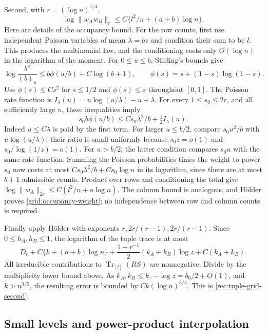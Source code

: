 Second, with $r=(\log n)^{1/4}$,
\begin{equation}\label{grid:occupancy-weight}
 \log\|w_Aw_B\|_r\le C\{l^2/n+(a+b)\log n\}.
\end{equation}
Here are details of the occupancy bound. For the row counts, first
use independent Poisson variables of mean $\lambda=bz$ and
condition their sum to be $l$. This produces the multinomial law,
and the conditioning costs only $O(\log n)$ in the logarithm of
the moment. For $0\le u\le b$, Stirling's bounds give
\[
 \log\frac{b^u}{(b)_u}
 \le b\phi(u/b)+C\log(b+1),\qquad
 \phi(s)=s+(1-s)\log(1-s).
\]
Use $\phi(s)\le Cs^2$ for $s\le1/2$ and $\phi(s)\le s$
throughout $[0,1]$. The Poisson rate function is
$I_\lambda(u)=u\log(u/\lambda)-u+\lambda$. For every
$1\le s_0\le2r$, and all sufficiently large $n$, these inequalities
imply
\[
 s_0b\phi(u/b)
 \le C s_0\lambda^2/b+\tfrac12I_\lambda(u).
\]
Indeed $u\le C\lambda$ is paid by the first term. For larger
$u\le b/2$, compare $s_0u^2/b$ with
$u\log(u/\lambda)$; their ratio is small uniformly because
$s_0z=o(1)$ and $s_0/\log(1/z)=o(1)$. For $u>b/2$, the latter
condition compares $s_0u$ with the same rate function. Summing
the Poisson probabilities times the weight to power $s_0$ now
costs at most
$C s_0\lambda^2/b+C s_0\log n$ in its logarithm, since there
are at most $b+1$ admissible counts. Product over rows and
conditioning the total give
$\log\|w_A\|_{2r}\le C(l^2/n+a\log n)$.
The column bound is analogous, and H\"older proves
\eqref{grid:occupancy-weight}; no independence between row and
column counts is required.

Finally apply H\"older with exponents $r,2r/(r-1),2r/(r-1)$.
Since $0\le h_A,h_B\le1$, the logarithm of the tuple trace is at
most
\[
 D_c+C\{k+(a+b)\log n\}
 +\frac{1-r^{-1}}2(k_A+k_B)\log z+C(k_A+k_B).
\]
All irreducible contributions to $\operatorname{Tr}_{[l]}(RS)$
are nonnegative. Divide by the multiplicity lower bound above.
As $k_A,k_B\le k$, $-\log z=b_0/2+O(1)$, and
$k>n^{3/5}$, the resulting error is bounded by
$Ck(\log n)^{3/4}$. This is \eqref{rec:tuple-grid-second}.

\subsection{Small levels and power-product interpolation}

